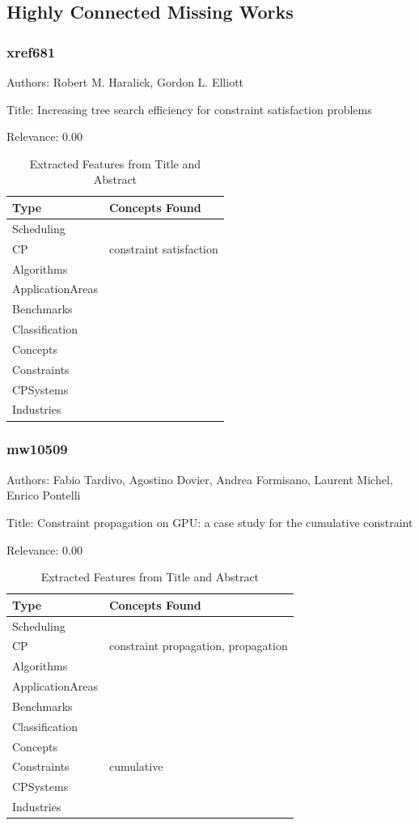 \subsection{Highly Connected Missing Works}

\subsubsection{xref681}
\label{mw:xref681}

Authors: Robert M. Haralick, Gordon L. Elliott

Title: Increasing tree search efficiency for constraint satisfaction problems

Relevance:  0.00

{\scriptsize
\begin{longtable}{p{2cm}p{20cm}}
\caption{Extracted Features from Title and Abstract}\\ \toprule
Type & Concepts Found\\ \midrule
\endhead
\bottomrule
\endfoot
Scheduling & \\ 
CP & constraint satisfaction\\ 
Algorithms & \\ 
ApplicationAreas & \\ 
Benchmarks & \\ 
Classification & \\ 
Concepts & \\ 
Constraints & \\ 
CPSystems & \\ 
Industries & \\ 
\end{longtable}
}



\subsubsection{mw10509}
\label{mw:mw10509}

Authors: Fabio Tardivo, Agostino Dovier, Andrea Formisano, Laurent Michel, Enrico Pontelli

Title: Constraint propagation on GPU: a case study for the cumulative constraint

Relevance:  0.00

{\scriptsize
\begin{longtable}{p{2cm}p{20cm}}
\caption{Extracted Features from Title and Abstract}\\ \toprule
Type & Concepts Found\\ \midrule
\endhead
\bottomrule
\endfoot
Scheduling & \\ 
CP & constraint propagation, propagation\\ 
Algorithms & \\ 
ApplicationAreas & \\ 
Benchmarks & \\ 
Classification & \\ 
Concepts & \\ 
Constraints & cumulative\\ 
CPSystems & \\ 
Industries & \\ 
\end{longtable}
}



